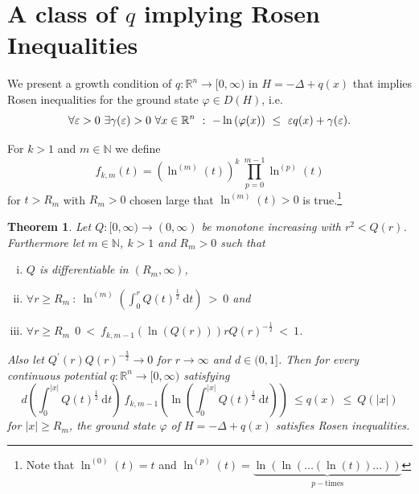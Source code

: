 \documentclass[12pt,longbibliography]{article}
\def\N{\mathbb{N}}
\def\R{\mathbb{R}}
\newtheorem{thm}{Theorem}[section]
\theoremstyle{definition}
\theoremstyle{remark}
\theoremstyle{example}
\begin{document}
\section{A class of $q$ implying Rosen Inequalities} \label{Main_theorems_Rosen}

We present a growth condition of $q \colon \R^{n} \to [0,\infty)$ in 
$H = -\Delta + q(x)$ that implies Rosen inequalities for the ground state $\varphi \in D(H)$, i.e.
\begin{equation}\label{Rosen}
\forall \varepsilon > 0 \ \exists \gamma(\varepsilon) > 0 \ \forall x \in \R^{n} \ : \ 
-\ln \left( \varphi(x) \right) \ \leq \ \varepsilon q(x) + \gamma(\varepsilon).\\
\end{equation}

For $k>1$ and $m \in \N$ we define  
\begin{equation}
f_{k, m} (t) = \left( \ln^{(m)}(t) \right)^{k} \ \prod_{p=0}^{m-1} \ln^{(p)}(t)
\end{equation} 
for $t > R_{m}$ with $R_{m} > 0$ chosen large that $\ln^{(m)}(t) > 0$ is true.\footnote{Note that $\ln^{(0)}(t) = t$ and
$\ln^{(p)}(t) =\underbrace{\ln(\ln(\dots(\ln(t)) \dots))}_{p-\text{times}}$}\\

\begin{thm} \label{Main_Thm_2}
Let $Q \colon [0,\infty) \to (0,\infty)$ be monotone increasing with $r^{2} < Q(r)$. Furthermore let 
$m \in \N$, $k>1$ and $R_{m} > 0$ such that
\begin{enumerate}[i.)]
\item $Q$ is differentiable in $(R_{m}, \infty)$,
\item $\forall  r \geq R_{m} \ : \ \ln^{(m)}\left(  \int_{0}^{r} Q(t)^{\frac{1}{2}} \ \mathrm{d}t  \right) \ > \ 0$ and
\item $\forall  r \geq R_{m} \: \ 0 \ < \ f_{k, m-1}\left( \ln \left( Q(r) \right) \right)rQ(r)^{-\frac{1}{2}} \ < \ 1$.\\
\end{enumerate} 
Also let $Q^{\prime}(r)Q(r)^{-\frac{3}{2}} \to 0$ for $r \to \infty$ and $d \in (0,1]$. Then for every continuous 
potential $q \colon \R^{n} \to [0,\infty)$ satisfying
\begin{equation}
d \left( \int_{0}^{ |x|} Q(t)^{\frac{1}{2}} \ \mathrm{d}t \right) \
f_{k, m-1} \left( \ln \left( \int_{0}^{ |x|} Q(t)^{\frac{1}{2}} \ \mathrm{d}t \right) \right) \ \leq q(x) \ \leq \ Q \left( |x| \right)
\end{equation}
for $|x| \geq R_{m}$, the ground state $\varphi$ of $H=-\Delta+q(x)$ satisfies Rosen inequalities.\\
\end{thm}
\end{document}

